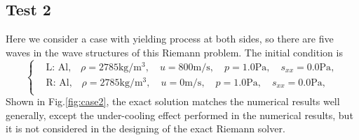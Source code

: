 \documentclass{article}
\numberwithin{equation}{section}
\numberwithin{table}{section}
\begin{document}
\subsection{Test 2}
Here we consider a case with yielding process at both sides, so there are five waves in the wave structures of this Riemann problem. The initial condition is
\begin{equation}
 \left\{ \begin{aligned}
	 &	 \text{L: Al,}\quad  \rho = 2785 \text{kg}/\text{m}^3, \quad  u = 800\text{m}/\text{s}, \quad  p = 1.0\text{Pa}, \quad  s_{xx}=0.0 \text{Pa},\\
&	 \text{R: Al,}\quad  \rho = 2785 \text{kg}/\text{m}^3, \quad  u = 0\text{m}/\text{s}, \quad  p = 1.0\text{Pa}, \quad  s_{xx}=0.0 \text{Pa},\\
   \end{aligned}
 \right.
\end{equation}
Shown in Fig.\ref{fig:case2}, the exact solution matches the numerical results well generally, except the under-cooling effect performed in the numerical results, but it is not considered in the designing of the exact Riemann solver.
\end{document}

